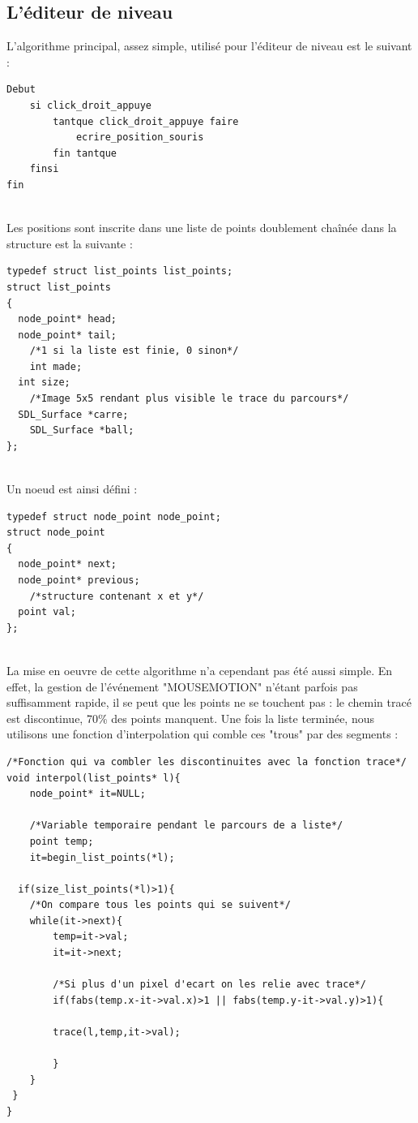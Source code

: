 \subsection{L'éditeur de niveau}
L'algorithme principal, assez simple, utilisé pour l'éditeur de niveau est le suivant :
\begin{lstlisting}[language=Pascal]
Debut
	si click_droit_appuye
		tantque click_droit_appuye faire
			ecrire_position_souris
		fin tantque
	finsi
fin
\end{lstlisting}
~\\
Les positions sont inscrite dans une liste de points doublement chaînée dans la structure est la suivante :
\begin{lstlisting}
typedef struct list_points list_points;
struct list_points
{
  node_point* head; 	
  node_point* tail;
	/*1 si la liste est finie, 0 sinon*/
	int made;						
  int size;				
	/*Image 5x5 rendant plus visible le trace du parcours*/		
  SDL_Surface *carre;	
	SDL_Surface *ball;	
};
\end{lstlisting}
~\\
Un noeud est ainsi défini :
\begin{lstlisting}
typedef struct node_point node_point;
struct node_point
{
  node_point* next;  	  
  node_point* previous;	
	/*structure contenant x et y*/
  point val;						
};
\end{lstlisting}

~\\La mise en oeuvre de cette algorithme n'a cependant pas été aussi simple. En effet, la gestion de l'événement "MOUSEMOTION" n'étant parfois pas suffisamment rapide, il se peut que les points ne se touchent pas : le chemin tracé est discontinue, 70\% des points manquent.
Une fois la liste terminée, nous utilisons une fonction d'interpolation qui comble ces "trous" par des segments : 
\begin{lstlisting}
/*Fonction qui va combler les discontinuites avec la fonction trace*/
void interpol(list_points* l){ 	
	node_point* it=NULL;
						
	/*Variable temporaire pendant le parcours de a liste*/			
	point temp;									
	it=begin_list_points(*l);		
	
  if(size_list_points(*l)>1){	
	/*On compare tous les points qui se suivent*/	
	while(it->next){
		temp=it->val;
		it=it->next;

		/*Si plus d'un pixel d'ecart on les relie avec trace*/
		if(fabs(temp.x-it->val.x)>1 || fabs(temp.y-it->val.y)>1){
							
		trace(l,temp,it->val);

		}		
	}
 } 
}
\end{lstlisting}

